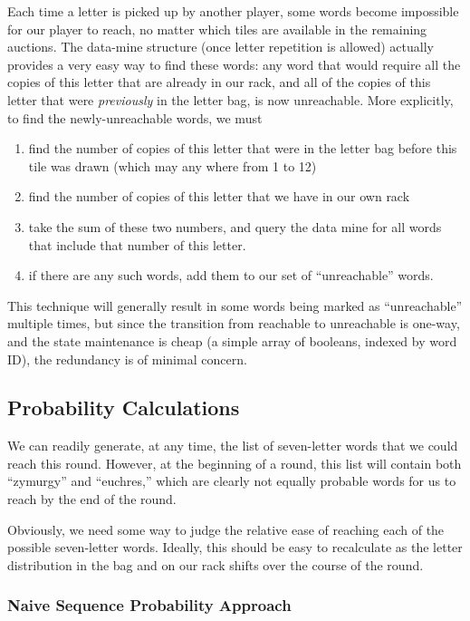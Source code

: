 \documentclass[11pt]{article}
\begin{document}
Each time a letter is picked up by another player, some words become impossible for our player to reach, no matter which tiles are available in the remaining auctions.  The data-mine structure (once letter repetition is allowed) actually provides a very easy way to find these words: any word that would require all the copies of this letter that are already in our rack, and all of the copies of this letter that were \textit{previously} in the letter bag, is now unreachable.  More explicitly, to find the newly-unreachable words, we must
\begin{enumerate}
\item find the number of copies of this letter that were in the letter bag before this tile was drawn (which may any where from 1 to 12)
\item find the number of copies of this letter that we have in our own rack
\item take the sum of these two numbers, and query the data mine for all words that include that number of this letter.
\item if there are any such words, add them to our set of ``unreachable'' words.
\end{enumerate}

This technique will generally result in some words being marked as ``unreachable'' multiple times, but since the transition from reachable to unreachable is one-way, and the state maintenance is cheap (a simple array of booleans, indexed by word ID), the redundancy is of minimal concern.

\subsection{Probability Calculations} %

We can readily generate, at any time, the list of seven-letter words that we could reach this round.  However, at the beginning of a round, this list will contain both ``zymurgy'' and ``euchres,'' which are clearly not equally probable words for us to reach by the end of the round.

Obviously, we need some way to judge the relative ease of reaching each of the possible seven-letter words.  Ideally, this should be easy to recalculate as the letter distribution in the bag and on our rack shifts over the course of the round.


\subsubsection{Naive Sequence Probability Approach}
\end{document}
